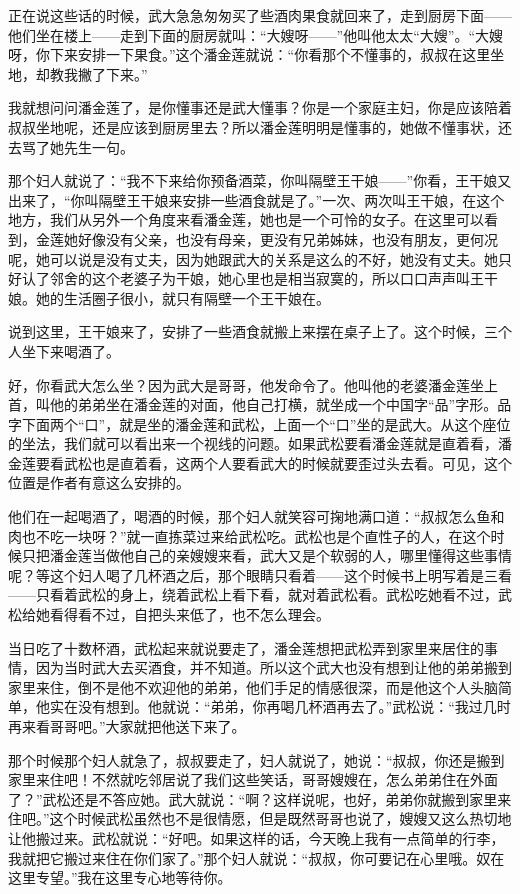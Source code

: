 \par 正在说这些话的时候，武大急急匆匆买了些酒肉果食就回来了，走到厨房下面——他们坐在楼上——走到下面的厨房就叫：“大嫂呀——”他叫他太太“大嫂”。“大嫂呀，你下来安排一下果食。”这个潘金莲就说：“你看那个不懂事的，叔叔在这里坐地，却教我撇了下来。”
\par 我就想问问潘金莲了，是你懂事还是武大懂事？你是一个家庭主妇，你是应该陪着叔叔坐地呢，还是应该到厨房里去？所以潘金莲明明是懂事的，她做不懂事状，还去骂了她先生一句。
\par 那个妇人就说了：“我不下来给你预备酒菜，你叫隔壁王干娘——”你看，王干娘又出来了，“你叫隔壁王干娘来安排一些酒食就是了。”一次、两次叫王干娘，在这个地方，我们从另外一个角度来看潘金莲，她也是一个可怜的女子。在这里可以看到，金莲她好像没有父亲，也没有母亲，更没有兄弟姊妹，也没有朋友，更何况呢，她可以说是没有丈夫，因为她跟武大的关系是这么的不好，她没有丈夫。她只好认了邻舍的这个老婆子为干娘，她心里也是相当寂寞的，所以口口声声叫王干娘。她的生活圈子很小，就只有隔壁一个王干娘在。
\par 说到这里，王干娘来了，安排了一些酒食就搬上来摆在桌子上了。这个时候，三个人坐下来喝酒了。
\par 好，你看武大怎么坐？因为武大是哥哥，他发命令了。他叫他的老婆潘金莲坐上首，叫他的弟弟坐在潘金莲的对面，他自己打横，就坐成一个中国字“品”字形。品字下面两个“口”，就是坐的潘金莲和武松，上面一个“口”坐的是武大。从这个座位的坐法，我们就可以看出来一个视线的问题。如果武松要看潘金莲就是直着看，潘金莲要看武松也是直着看，这两个人要看武大的时候就要歪过头去看。可见，这个位置是作者有意这么安排的。
\par 他们在一起喝酒了，喝酒的时候，那个妇人就笑容可掬地满口道：“叔叔怎么鱼和肉也不吃一块呀？”就一直拣菜过来给武松吃。武松也是个直性子的人，在这个时候只把潘金莲当做他自己的亲嫂嫂来看，武大又是个软弱的人，哪里懂得这些事情呢？等这个妇人喝了几杯酒之后，那个眼睛只看着——这个时候书上明写着是三看——只看着武松的身上，绕着武松上看下看，就对着武松看。武松吃她看不过，武松给她看得看不过，自把头来低了，也不怎么理会。
\par 当日吃了十数杯酒，武松起来就说要走了，潘金莲想把武松弄到家里来居住的事情，因为当时武大去买酒食，并不知道。所以这个武大也没有想到让他的弟弟搬到家里来住，倒不是他不欢迎他的弟弟，他们手足的情感很深，而是他这个人头脑简单，他实在没有想到。他就说：“弟弟，你再喝几杯酒再去了。”武松说：“我过几时再来看哥哥吧。”大家就把他送下来了。
\par 那个时候那个妇人就急了，叔叔要走了，妇人就说了，她说：“叔叔，你还是搬到家里来住吧！不然就吃邻居说了我们这些笑话，哥哥嫂嫂在，怎么弟弟住在外面了？”武松还是不答应她。武大就说：“啊？这样说呢，也好，弟弟你就搬到家里来住吧。”这个时候武松虽然也不是很情愿，但是既然哥哥也说了，嫂嫂又这么热切地让他搬过来。武松就说：“好吧。如果这样的话，今天晚上我有一点简单的行李，我就把它搬过来住在你们家了。”那个妇人就说：“叔叔，你可要记在心里哦。奴在这里专望。”我在这里专心地等待你。

